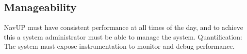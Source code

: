 \documentclass[english]{article}
\begin{document}
	\subsection{Manageability}
	NavUP must have consistent performance at all times of the day, and to achieve this a system administrator must be able to manage the system.
	\newline
	\newline
	{Quantification:} The system must expose instrumentation to monitor and debug performance.
	
	
		\clearpage
		
		
		
		
		
		

		
		
\end{document}
